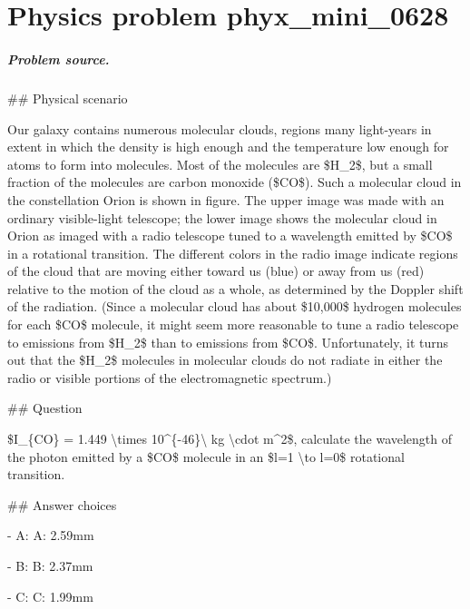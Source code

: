 
\chapter{Physics problem phyx\_mini\_0628}
\label{ch:PhyXMiniProblems_problem_phyx_mini_0628}

\paragraph{Problem source.}
\#\# Physical scenario

Our galaxy contains numerous molecular clouds, regions many light-years in extent in which the density is high enough and the temperature low enough for atoms to form into molecules. Most of the molecules are \$H\_2\$, but a small fraction of the molecules are carbon monoxide (\$CO\$). Such a molecular cloud in the constellation Orion is shown in figure. The upper image was made with an ordinary visible-light telescope; the lower image shows the molecular cloud in Orion as imaged with a radio telescope tuned to a wavelength emitted by \$CO\$ in a rotational transition. The different colors in the radio image indicate regions of the cloud that are moving either toward us (blue) or away from us (red) relative to the motion of the cloud as a whole, as determined by the Doppler shift of the radiation. (Since a molecular cloud has about \$10,000\$ hydrogen molecules for each \$CO\$ molecule, it might seem more reasonable to tune a radio telescope to emissions from \$H\_2\$ than to emissions from \$CO\$. Unfortunately, it turns out that the \$H\_2\$ molecules in molecular clouds do not radiate in either the radio or visible portions of the electromagnetic spectrum.)

\#\# Question

\$I\_\{CO\} = 1.449 \textbackslash{}times 10\textasciicircum{}\{-46\}\textbackslash{} kg \textbackslash{}cdot m\textasciicircum{}2\$, calculate the wavelength of the photon emitted by a \$CO\$ molecule in an \$l=1 \textbackslash{}to l=0\$ rotational transition.

\#\# Answer choices

- A: A: 2.59mm

- B: B: 2.37mm

- C: C: 1.99mm

